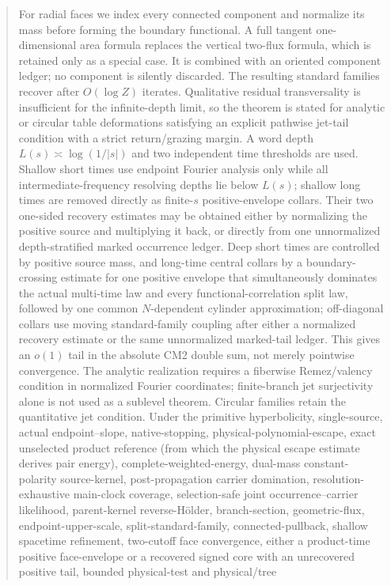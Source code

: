 \documentclass[11pt]{article}
\begin{document}
\begin{abstract}
For radial faces we index every connected component and normalize its mass
before forming the boundary functional.  A full tangent one-dimensional area
formula replaces the vertical two-flux formula, which is retained only as a
special case.  It is combined with an oriented component ledger; no component is silently
discarded.  The resulting standard families recover after $O(\log Z)$
iterates.  Qualitative residual transversality is insufficient for the
infinite-depth limit, so the theorem is stated for analytic or circular table
deformations satisfying an explicit pathwise jet-tail condition with a
strict return/grazing margin.  A word depth $L(s)\asymp\log(1/|s|)$ and two
independent time thresholds are used.  Shallow short times use endpoint
Fourier analysis only while all intermediate-frequency resolving depths lie
below $L(s)$; shallow long times are removed directly as finite-$s$
positive-envelope collars.  Their two one-sided recovery estimates may be
obtained either by normalizing the positive source and multiplying it back,
or directly from one unnormalized depth-stratified marked occurrence ledger.
Deep short times are controlled by positive source mass, and long-time
central collars by a boundary-crossing estimate for
one positive envelope that simultaneously dominates the actual multi-time law
and every functional-correlation split law, followed by one common
$N$-dependent cylinder approximation;
off-diagonal collars use moving standard-family coupling after either a
normalized recovery estimate or the same unnormalized marked-tail ledger.
This gives an
$o(1)$ tail in the absolute CM2 double sum, not merely pointwise convergence.
The analytic realization requires a fiberwise Remez/valency condition in
normalized Fourier coordinates; finite-branch jet surjectivity alone is not
used as a sublevel theorem.  Circular families retain the quantitative jet
condition.  Under the primitive hyperbolicity, single-source, actual
endpoint--slope, native-stopping, physical-polynomial-escape, exact
unselected product reference (from which the physical escape estimate
derives pair energy), complete-weighted-energy, dual-mass
constant-polarity source-kernel, post-propagation carrier domination,
resolution-exhaustive main-clock
coverage, selection-safe joint occurrence--carrier likelihood,
parent-kernel reverse-H\"older, branch-section,
geometric-flux, endpoint-upper-scale, split-standard-family,
connected-pullback, shallow spacetime refinement, two-cutoff face convergence,
either a product-time positive face-envelope or a recovered signed core with
an unrecovered positive tail, bounded physical-test and physical/tree

\end{abstract}
\end{document}
